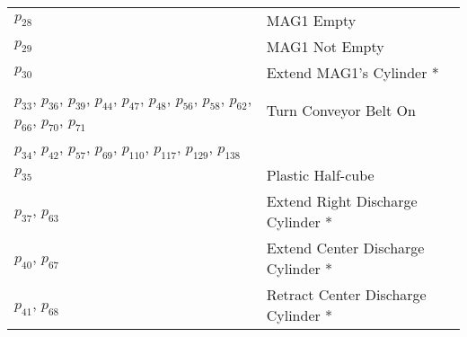 \begin{longtable}{m{5cm}m{5cm}}
\hyperlink{completeNet:p28}{\hypertarget{completeTable:p28}{$p_{28}$}} & MAG1 Empty\\
\hyperlink{completeNet:p29}{\hypertarget{completeTable:p29}{$p_{29}$}} & MAG1 Not Empty\\
\hyperlink{completeNet:p30}{\hypertarget{completeTable:p30}{$p_{30}$}} & Extend MAG1's Cylinder *\\
\hyperlink{completeNet:p33}{\hypertarget{completeTable:p33}{$p_{33}$}}, \hyperlink{completeNet:p36}{\hypertarget{completeTable:p36}{$p_{36}$}}, \hyperlink{completeNet:p39}{\hypertarget{completeTable:p39}{$p_{39}$}}, \hyperlink{completeNet:p44}{\hypertarget{completeTable:p44}{$p_{44}$}}, \hyperlink{completeNet:p47}{\hypertarget{completeTable:p47}{$p_{47}$}}, \hyperlink{completeNet:p48}{\hypertarget{completeTable:p48}{$p_{48}$}}, \hyperlink{completeNet:p56}{\hypertarget{completeTable:p56}{$p_{56}$}}, \hyperlink{completeNet:p58}{\hypertarget{completeTable:p58}{$p_{58}$}}, \hyperlink{completeNet:p62}{\hypertarget{completeTable:p62}{$p_{62}$}}, \hyperlink{completeNet:p66}{\hypertarget{completeTable:p66}{$p_{66}$}}, \hyperlink{completeNet:p70}{\hypertarget{completeTable:p70}{$p_{70}$}}, \hyperlink{completeNet:p71}{\hypertarget{completeTable:p71}{$p_{71}$}} & Turn Conveyor Belt On\\
\hyperlink{completeNet:p34}{\hypertarget{completeTable:p34}{$p_{34}$}}, \hyperlink{completeNet:p42}{\hypertarget{completeTable:p42}{$p_{42}$}}, \hyperlink{completeNet:p57}{\hypertarget{completeTable:p57}{$p_{57}$}}, \hyperlink{completeNet:p69}{\hypertarget{completeTable:p69}{$p_{69}$}}, \hyperlink{completeNet:p110}{\hypertarget{completeTable:p110}{$p_{110}$}}, \hyperlink{completeNet:p117}{\hypertarget{completeTable:p117}{$p_{117}$}}, \hyperlink{completeNet:p129}{\hypertarget{completeTable:p129}{$p_{129}$}}, \hyperlink{completeNet:p138}{\hypertarget{completeTable:p138}{$p_{138}$}} & \\
\hyperlink{completeNet:p35}{\hypertarget{completeTable:p35}{$p_{35}$}} & Plastic Half-cube\\
\hyperlink{completeNet:p37}{\hypertarget{completeTable:p37}{$p_{37}$}}, \hyperlink{completeNet:p63}{\hypertarget{completeTable:p63}{$p_{63}$}} & Extend Right Discharge Cylinder *\\
\hyperlink{completeNet:p40}{\hypertarget{completeTable:p40}{$p_{40}$}}, \hyperlink{completeNet:p67}{\hypertarget{completeTable:p67}{$p_{67}$}} & Extend Center Discharge Cylinder *\\
\hyperlink{completeNet:p41}{\hypertarget{completeTable:p41}{$p_{41}$}}, \hyperlink{completeNet:p68}{\hypertarget{completeTable:p68}{$p_{68}$}} & Retract Center Discharge Cylinder *\\

\end{longtable}
